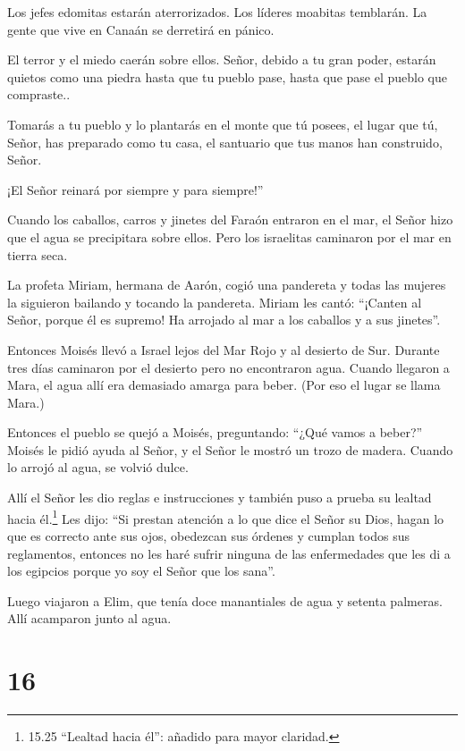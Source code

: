  Los jefes edomitas estarán aterrorizados. Los líderes
moabitas temblarán. La gente que vive en Canaán se derretirá en pánico.

 El terror y el miedo caerán sobre ellos. Señor, debido a
tu gran poder, estarán quietos como una piedra hasta que tu pueblo pase,
hasta que pase el pueblo que compraste..

 Tomarás a tu pueblo y lo plantarás en el monte que tú
posees, el lugar que tú, Señor, has preparado como tu casa, el santuario
que tus manos han construido, Señor.

 ¡El Señor reinará por siempre y para siempre!''

 Cuando los caballos, carros y jinetes del Faraón entraron
en el mar, el Señor hizo que el agua se precipitara sobre ellos. Pero
los israelitas caminaron por el mar en tierra seca.

 La profeta Miriam, hermana de Aarón, cogió una pandereta y
todas las mujeres la siguieron bailando y tocando la pandereta.
 Miriam les cantó: ``¡Canten al Señor, porque él es
supremo! Ha arrojado al mar a los caballos y a sus jinetes''.

 Entonces Moisés llevó a Israel lejos del Mar Rojo y al
desierto de Sur. Durante tres días caminaron por el desierto pero no
encontraron agua.  Cuando llegaron a Mara, el agua allí era
demasiado amarga para beber. (Por eso el lugar se llama Mara.)

 Entonces el pueblo se quejó a Moisés, preguntando: ``¿Qué
vamos a beber?''  Moisés le pidió ayuda al Señor, y el
Señor le mostró un trozo de madera. Cuando lo arrojó al agua, se volvió
dulce.

Allí el Señor les dio reglas e instrucciones y también puso a prueba su
lealtad hacia él.\footnote{15.25 ``Lealtad hacia él'': añadido para
  mayor claridad.}  Les dijo: ``Si prestan atención a lo
que dice el Señor su Dios, hagan lo que es correcto ante sus ojos,
obedezcan sus órdenes y cumplan todos sus reglamentos, entonces no les
haré sufrir ninguna de las enfermedades que les di a los egipcios porque
yo soy el Señor que los sana''.

 Luego viajaron a Elim, que tenía doce manantiales de agua
y setenta palmeras. Allí acamparon junto al agua.

\hypertarget{section-15}{%
\section{16}\label{section-15}}

